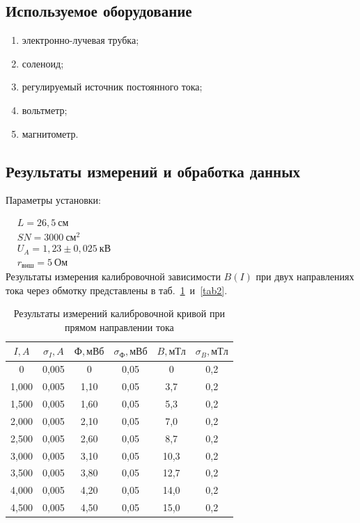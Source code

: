\documentclass[a4paper, 12pt]{article}
\begin{document}
\subsection{Используемое оборудование}

\begin{enumerate}
    \item электронно-лучевая трубка;
    \item соленоид;
    \item регулируемый источник постоянного тока;
    \item вольтметр;
    \item магнитометр.
\end{enumerate}

\subsection{Результаты измерений и обработка данных}

Параметры установки:

$\begin{aligned}
& L = 26,5~см\\
& SN = 3000~см^2\\
& U_A = 1,23\pm0,025~кВ\\
& r_{внш} = 5~Ом
\end{aligned}$\\[0,5 cm]

Результаты измерения калибровочной зависимости $B(I)$ при двух направлениях тока через обмотку представлены в таб.~\ref{tab1}~и~\ref{tab2}.

\begin{table}[h!]
\begin{center}
\begin{tabular}{|c|c|c|c|c|c|}
\hline
$I, A$ & $\sigma_{I}, A$ & $Ф, мВб$ & $\sigma_{Ф}, мВб$ & $B, мТл$ & $\sigma_{B}, мТл$ \\ \hline
0      & 0,005   & 0        & 0,05      & 0        & 0,2       \\ \hline
1,000  & 0,005   & 1,10     & 0,05      & 3,7      & 0,2       \\ \hline
1,500  & 0,005   & 1,60     & 0,05      & 5,3      & 0,2       \\ \hline
2,000  & 0,005   & 2,10     & 0,05      & 7,0      & 0,2       \\ \hline
2,500  & 0,005   & 2,60     & 0,05      & 8,7      & 0,2       \\ \hline
3,000  & 0,005   & 3,10     & 0,05      & 10,3     & 0,2       \\ \hline
3,500  & 0,005   & 3,80     & 0,05      & 12,7     & 0,2       \\ \hline
4,000  & 0,005   & 4,20     & 0,05      & 14,0     & 0,2       \\ \hline
4,500  & 0,005   & 4,50     & 0,05      & 15,0     & 0,2       \\ \hline
\end{tabular}
\end{center}
\caption{Результаты измерений калибровочной кривой при прямом направлении тока}
\label{tab1}
\end{table}
\end{document}
